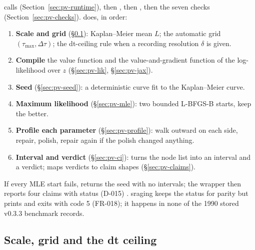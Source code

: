  calls  (Section~\ref{sec:pv-runtime}), then
 , then 
, then the seven checks (Section~\ref{sec:pv-checks}).  does,
in order:
\begin{enumerate}[nosep]
  \item \textbf{Scale and grid} (\S\ref{sec:pv-grid}): Kaplan--Meier mean $L$; the automatic grid
    $(\tau_{\max},\Delta\tau)$; the dt-ceiling rule when a recording resolution $\delta$ is given.
  \item \textbf{Compile} the value function and the value-and-gradient function of the log-likelihood over $z$
    (\S\ref{sec:pv-lik}, \S\ref{sec:pv-jax}).
  \item \textbf{Seed} (\S\ref{sec:pv-seed}): a deterministic curve fit to the Kaplan--Meier curve.
  \item \textbf{Maximum likelihood} (\S\ref{sec:pv-mle}): two bounded L-BFGS-B starts, keep the better.
  \item \textbf{Profile each parameter} (\S\ref{sec:pv-profile}): walk outward on each side, repair, polish,
    repair again if the polish changed anything.
  \item \textbf{Interval and verdict} (\S\ref{sec:pv-ci}):  turns the node list into an
    interval and a verdict;  maps verdicts to claim shapes (\S\ref{sec:pv-claims}).
\end{enumerate}
If every MLE start fails,  returns the seed with no intervals; the wrapper then reports
four  claims with status  (D-015) . sraging keeps the
status for parity but prints  and exits with code 5 (FR-018); it happens in none of the
1990 stored v0.3.3 benchmark records.

\subsection{Scale, grid and the dt ceiling}\label{sec:pv-grid}

